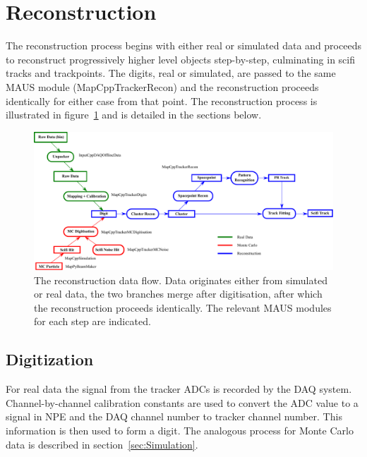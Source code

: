 \section{Reconstruction}
\label{sec:Reconstruction}
The reconstruction process begins with either real or simulated data and proceeds to reconstruct progressively higher level objects step-by-step, culminating in scifi tracks and trackpoints. The digits, real or simulated, are passed to the same MAUS module (MapCppTrackerRecon) and the reconstruction proceeds identically for either case from that point. The reconstruction process is illustrated in figure~\ref{fig:DataFlow} and is detailed in the sections below.

\begin{figure}[tbh]
  \begin{center}
    \includegraphics[width=0.95\linewidth]{07-Reconstruction/DataFlow2014.pdf}
    \caption{\label{fig:DataFlow} The reconstruction data flow. Data originates either from simulated or real data, the two branches merge after digitisation, after which the reconstruction proceeds identically.  The relevant MAUS modules for each step are indicated.}
  \end{center}
\end{figure}

  \subsection{Digitization}
  \label{subsec:Digitization}
  For real data the signal from the tracker ADCs is recorded by the DAQ system.  Channel-by-channel calibration constants are used to convert the ADC value to a signal in NPE and the DAQ channel number to tracker channel number.  This information is then used to form a digit.  The analogous process for Monte Carlo data is described in section~\ref{sec:Simulation}.

